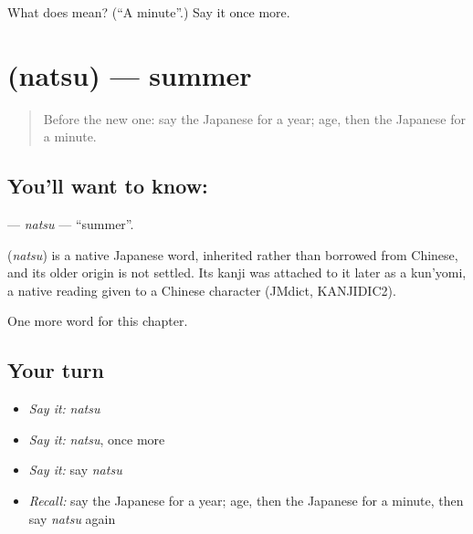\begin{tcolorbox}[breakable,colback=teal!4,colframe=teal!35!black,title={Before you move on}]
What does  mean? (\textquotedblleft{}A minute\textquotedblright{}.) Say it once more.
\end{tcolorbox}
\section[\texorpdfstring{\ja{なつ} (natsu)}{なつ (natsu)}]{ (natsu) — summer}

\label{lesson:JA-C55-natsu}



\begin{quote}
Before the new one: say the Japanese for a year; age, then the Japanese for a minute.
\end{quote}

\subsection*{You'll want to know: }
\textbf{} — \emph{natsu} — \textquotedblleft{}summer\textquotedblright{}.

\begin{cousinweb}
\textbf{} (\emph{natsu}) is a native Japanese word, inherited rather than borrowed from Chinese, and its older origin is not settled. Its kanji was attached to it later as a kun'yomi, a native reading given to a Chinese character (JMdict, KANJIDIC2).
\end{cousinweb}

\begin{grammarlens}[title={What you've built}]
One more word for this chapter.
\end{grammarlens}

\subsection*{Your turn}
\begin{itemize}
\raggedright
  \item \emph{Say it:} \emph{natsu}
  \item \emph{Say it:} \emph{natsu}, once more
  \item \emph{Say it:} say \emph{natsu}
  \item \emph{Recall:} say the Japanese for a year; age, then the Japanese for a minute, then say \emph{natsu} again
\end{itemize}

